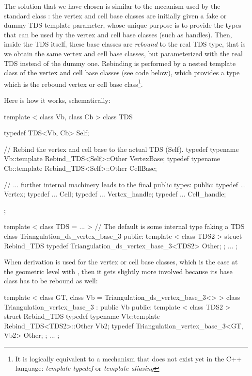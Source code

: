 The solution that we have chosen is similar to the mecanism used by the
standard class : the vertex and cell base classes are
initially given a fake or dummy TDS template parameter, whose unique purpose
is to provide the types that can be used by the vertex and cell base classes
(such as handles).  Then, inside the TDS itself, these base classes are
\textit{rebound} to the real TDS type, that is we obtain the same vertex
and cell base classes, but parameterized with the real TDS instead of the dummy
one.  Rebinding is performed by a nested template class of the vertex and cell
base classes (see code below), which provides a type which is the rebound
vertex or cell base class\footnote{It is logically equivalent to a mechanism
that does not exist yet in the C++ language: \textit{template typedef} or
\textit{template aliasing}}.

Here is how it works, schematically:

\begin{ccExampleCode}
template < class Vb, class Cb >
class TDS
{
  typedef TDS<Vb, Cb>    Self;

  // Rebind the vertex and cell base to the actual TDS (Self).
  typedef typename Vb::template Rebind_TDS<Self>::Other  VertexBase;
  typedef typename Cb::template Rebind_TDS<Self>::Other  CellBase;

  // ... further internal machinery leads to the final public types:
public:
  typedef ...  Vertex;
  typedef ...  Cell;
  typedef ...  Vertex_handle;
  typedef ...  Cell_handle;
};

template < class TDS = ... >  // The default is some internal type faking a TDS
class Triangulation_ds_vertex_base_3
{
public:
  template < class TDS2 >
  struct Rebind_TDS {
    typedef Triangulation_ds_vertex_base_3<TDS2>    Other;
  };
...
};
\end{ccExampleCode}

When derivation is used for the vertex or cell base classes, which is the
case at the geometric level with , then
it gets slightly more involved because its base class has to be rebound as
well:

\begin{ccExampleCode}
template < class GT, class Vb = Triangulation_ds_vertex_base_3<> >
class Triangulation_vertex_base_3 : public Vb
{
public:
  template < class TDS2 >
  struct Rebind_TDS {
    typedef typename Vb::template Rebind_TDS<TDS2>::Other  Vb2;
    typedef Triangulation_vertex_base_3<GT, Vb2>           Other;
  };
...
};
\end{ccExampleCode}

